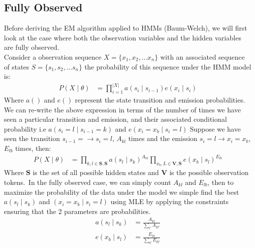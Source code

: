 \documentclass[11pt,letterpaper]{article}
\begin{document}
\subsection{Fully Observed}
Before deriving the EM algorithm applied to HMMs (Baum-Welch), we will first
look at the case where both the observation variables and the hidden variables
are fully observed.\\
Consider a observation sequence $X = \{x_1, x_2, \ldots x_n \}$ with an associated sequence of states $S = \{s_1, s_2, \ldots s_n\}$ the probability
of this sequence under the HMM model is:
\begin{align}
P(X \mid \theta) &= \prod_{i=1}^{|X|} a(s_i \mid s_{i-1}) e(x_i \mid
s_i)\label{eq1}
\end{align}
Where $a()$ and $e()$ represent the state transition and emission probabilities.
We can re-write the above expression in terms of the number of times we have
seen a particular transition and emission, and their associated conditional
probability i.e $a(s_i = l \mid s_{i-1} = k)$ and $e(x_i = x_b \mid s_i = l)$
Suppose we have seen the transition $ s_{i-1} = 
\rightarrow s_i = l $,
$A_{kl}$ times and the emission $s_i = l \rightarrow x_i = x_b$, $E_{lb}$ times,
then:\\
\begin{align}
P(X \mid \theta) &= \prod_{ k,l \in \mathbf{S,S}} a(s_l \mid s_k)^{A_{kl}}
\prod_{ x_b,L \in \mathbf{V,S}}e(x_b \mid s_l)^{E_{lb}}\label{eq2}
\end{align}
Where $\mathbf{S}$ is the set of all possible hidden states and $\mathbf{V}$ is
the possible observation tokens.\
In the fully observed case, we can simply count $A_{kl}$ and $E_{lb}$, then to
maximize the probability of the data under the model we simple find the best
$a(s_l \mid s_k)$ and $(x_i = x_b \mid s_i = l)$ using MLE by applying the
constraints ensuring that the 2 parameters are probabilities.
\begin{align*}
a(s_l \mid s_k) &= \frac{A_{kl}}{\sum_{l'} A_{kl'}}\\
e(x_b \mid s_l) &=
\frac{E_{lb}}{\sum_{b'} E_{lb'}}\\
\end{align*}
\end{document}
